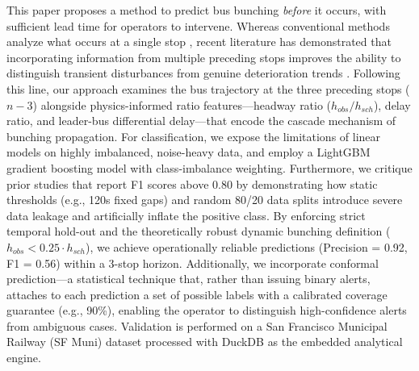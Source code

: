 \documentclass[fleqn,10pt,lineno]{wlpeerj}
\begin{document}
This paper proposes a method to predict bus bunching \textit{before} it occurs, with sufficient
lead time for operators to intervene. Whereas conventional methods analyze what occurs at a
single stop \citep{8}, recent literature has demonstrated that incorporating information from
multiple preceding stops improves the ability to distinguish transient disturbances from genuine
deterioration trends \citep{3,15}. Following this line, our approach examines the bus trajectory
at the three preceding stops ($n{-}3$) alongside physics-informed ratio features---headway ratio ($h_{obs}/h_{sch}$), delay ratio, and leader-bus differential delay---that encode the cascade mechanism of bunching propagation. For classification, we expose the limitations of linear models on highly imbalanced, noise-heavy data, and employ a LightGBM gradient boosting model with class-imbalance weighting. Furthermore, we critique prior studies that report F1 scores above 0.80 by demonstrating how static thresholds (e.g., 120s fixed gaps) and random 80/20 data splits introduce severe data leakage and artificially inflate the positive class. By enforcing strict temporal hold-out and the theoretically robust dynamic bunching definition ($h_{obs} < 0.25 \cdot h_{sch}$), we achieve operationally reliable predictions (Precision = 0.92, F1 = 0.56) within a 3-stop horizon. Additionally, we incorporate
conformal prediction---a statistical technique that, rather than issuing binary alerts, attaches
to each prediction a set of possible labels with a calibrated coverage guarantee (e.g., 90\%),
enabling the operator to distinguish high-confidence alerts from ambiguous cases. Validation is
performed on a San Francisco Municipal Railway (SF Muni) dataset processed with DuckDB \citep{14}
as the embedded analytical engine.
\end{document}
